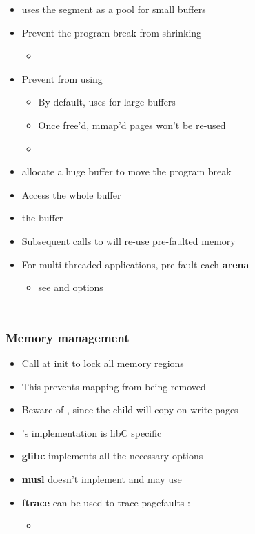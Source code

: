 \begin{frame}
\begin{columns}
\begin{itemize}
				\item {} uses the  segment as a pool for small buffers
				\item Prevent the program break from shrinking
					\begin{itemize}
						\item {}
					\end{itemize}
				\item Prevent  from using 
					\begin{itemize}
						\item By default,  uses  for large buffers
						\item Once free'd, mmap'd pages won't be re-used
						\item {}
					\end{itemize}
				\item allocate a huge buffer to move the program break
				\item Access the whole buffer
				\item {} the buffer
				\item Subsequent calls to  will re-use pre-faulted memory
				\item For multi-threaded applications, pre-fault each \textbf{arena}
					\begin{itemize}
						\item see  and   options
					\end{itemize}
			\end{itemize}
	\end{columns}

\end{frame}

\begin{frame}
	\frametitle{Memory management}
	\begin{itemize}
		\item Call  at init to lock all memory regions
		\item This prevents mapping from being removed
		\item Beware of , since the child will copy-on-write pages
		\item {}'s implementation is libC specific
		\item \textbf{glibc} implements all the necessary options
		\item \textbf{musl} doesn't implement  and may use 
		\item \textbf{ftrace} can be used to trace pagefaults :
			\begin{itemize}
				\item {}
			\end{itemize}
	\end{itemize}
\end{frame}

